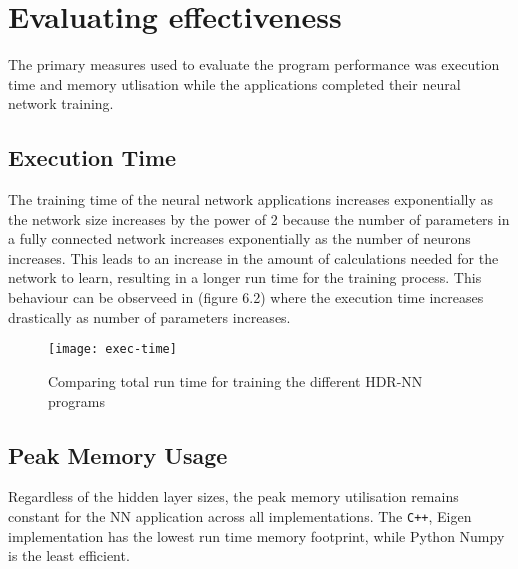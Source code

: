 


\section{Evaluating effectiveness}


The primary measures used to evaluate the program performance was execution time and memory utlisation while the applications completed their neural network training.

\subsection{Execution Time}
The training time of the neural network applications increases exponentially as the network size increases by the power of 2 because the number of parameters in a fully connected network increases exponentially as the number of neurons increases. This leads to an increase in the amount of calculations needed for the network to learn, resulting in a longer run time for the training process. This behaviour can be observeed in (figure 6.2) where the execution time increases drastically as number of parameters increases.

\begin{figure}[!ht]
	\centering
	\texttt{[image: exec-time]}
	\caption[Execution Time vs Model Parameters]{Comparing total run time for training the different HDR-NN programs}
\end{figure}

\subsection{Peak Memory Usage}
Regardless of the hidden layer sizes, the peak memory utilisation remains constant for the NN application across all implementations. The \texttt{C++}, Eigen implementation has the lowest run time memory footprint, while Python Numpy is the least efficient.

